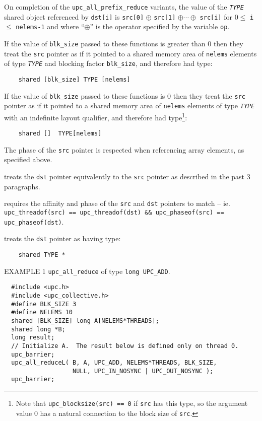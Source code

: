 \np On completion of the {\tt upc\_all\_prefix\_reduce} variants, 
the value of the {\tt {\em TYPE}} shared object
referenced by {\tt dst[i]} is
{\tt src[0]} $\oplus$ {\tt src[1]}
$\oplus \cdots \oplus$ {\tt src[i]}
for $0 \leq$ {\tt i} $\leq$ {\tt nelems-1} and
where ``$\oplus$'' is the operator specified by the variable {\tt op}.

\np
If the value of {\tt blk\_size} passed to these functions is
greater than 0 then they treat the {\tt src} pointer
as if it pointed to a shared memory area of {\tt nelems} elements of
type {\tt {\em TYPE}} and blocking factor {\tt blk\_size}, and therefore
had type:

\begin{verbatim}
    shared [blk_size] TYPE [nelems]
\end{verbatim}

\np
If the value of {\tt blk\_size} passed to these functions is
0 then they treat the {\tt src} pointer
as if it pointed to a shared memory area of {\tt nelems} elements of
type {\tt {\em TYPE}} with an indefinite layout qualifier, and
therefore had
type\footnote{Note that {\tt upc\_blocksize(src) == 0} if
{\tt src} has this type, so the argument value 0 has a natural
connection to the block size of {\tt src}.}:

\begin{verbatim}
    shared []  TYPE[nelems]
\end{verbatim}

\np The phase of the {\tt src} pointer is respected when
referencing array elements, as specified above.

 treats the {\tt dst} pointer
    equivalently to the {\tt src} pointer as described in the past 3
    paragraphs.
    
 requires the affinity and
phase of the {\tt src} and {\tt dst} pointers to match -- ie. 
{\tt upc\_threadof(src) == upc\_threadof(dst) \&\& upc\_phaseof(src) == upc\_phaseof(dst)}.

 treats the {\tt dst} pointer as having type:

\begin{verbatim}
    shared TYPE *
\end{verbatim}

\np EXAMPLE 1 {\tt upc\_all\_reduce} of type {\tt long UPC\_ADD}.
\begin{verbatim}
  #include <upc.h>
  #include <upc_collective.h>
  #define BLK_SIZE 3
  #define NELEMS 10
  shared [BLK_SIZE] long A[NELEMS*THREADS];
  shared long *B;
  long result;
  // Initialize A.  The result below is defined only on thread 0.
  upc_barrier;
  upc_all_reduceL( B, A, UPC_ADD, NELEMS*THREADS, BLK_SIZE,
                   NULL, UPC_IN_NOSYNC | UPC_OUT_NOSYNC );
  upc_barrier;
\end{verbatim}


